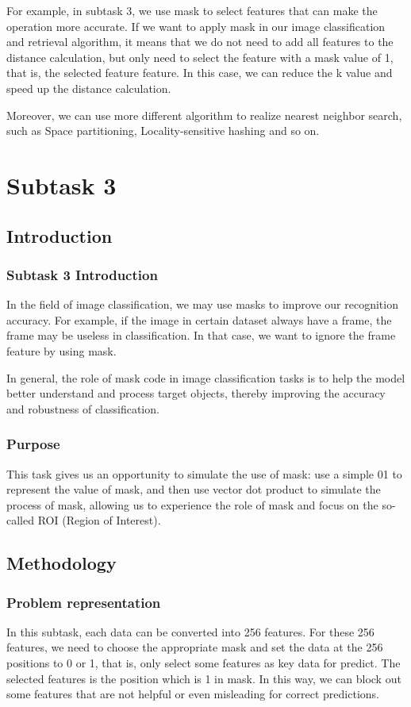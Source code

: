 \documentclass{article}
\begin{document}
For example, in subtask 3, we use mask to select features that can make the operation more accurate. If we want to apply mask in our image classification and retrieval algorithm, it means that we do not need to add all features to the distance calculation, but only need to select the feature with a mask value of 1, that is, the selected feature feature. In this case, we can reduce the k value and speed up the distance calculation.

Moreover, we can use more different algorithm to realize nearest neighbor search, such as Space partitioning, Locality-sensitive hashing and so on.

\section{Subtask 3}

\subsection{Introduction}

\subsubsection{Subtask 3 Introduction}
In the field of image classification, we may use masks to improve our recognition accuracy. For example, if the image in certain dataset always have a frame, the frame may be useless in classification. In that case, we want to ignore the frame feature by using mask.

In general, the role of mask code in image classification tasks is to help the model better understand and process target objects, thereby improving the accuracy and robustness of classification.

\subsubsection{Purpose}
This task gives us an opportunity to simulate the use of mask: use a simple 01 to represent the value of mask, and then use vector dot product to simulate the process of mask, allowing us to experience the role of mask and focus on the so-called ROI (Region of Interest).

\subsection{Methodology}
\subsubsection{Problem representation}
In this subtask, each data can be converted into 256 features. For these 256 features, we need to choose the appropriate mask and set the data at the 256 positions to 0 or 1, that is, only select some features as key data for predict. The selected features is the position which is 1 in mask. In this way, we can block out some features that are not helpful or even misleading for correct predictions.
\end{document}
